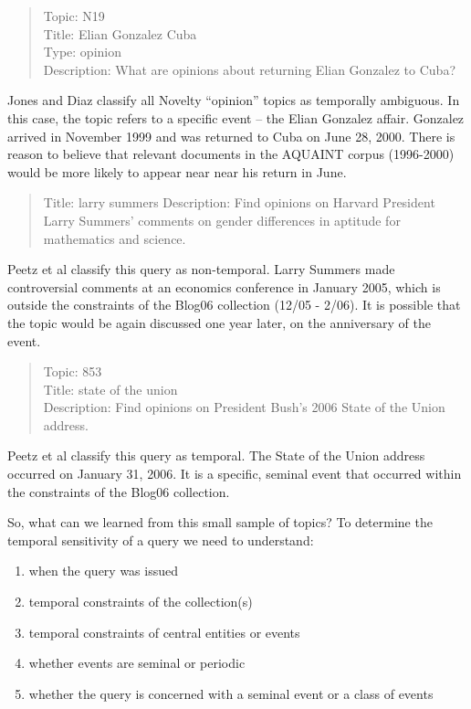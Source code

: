 \documentclass{sig-alternate}
\begin{document}
\begin{quote}
Topic: N19 \\
Title: Elian Gonzalez Cuba  \\
Type: opinion \\
Description: What are opinions about returning Elian Gonzalez to Cuba? \\
\end{quote}

Jones and Diaz classify all Novelty ``opinion'' topics as temporally ambiguous. In this case, the topic refers to a specific event -- the Elian Gonzalez affair. Gonzalez arrived in November 1999 and was returned to Cuba on June 28, 2000. There is reason to believe that relevant documents in the AQUAINT corpus (1996-2000) would be more likely to appear near near his return in June.

\begin{quote}
Title: larry summers	 
Description: Find opinions on Harvard President Larry Summers' comments on gender differences in aptitude for mathematics and science.
\end{quote}

Peetz et al classify this query as non-temporal.  Larry Summers made controversial comments at an economics conference in January 2005, which is outside the constraints of the Blog06 collection (12/05 - 2/06). It is possible that the topic would be again discussed one year later, on the anniversary of the event.

\begin{quote}
Topic: 853 \\
Title: state of the union \\	 
Description: Find opinions on President Bush's 2006 State of the Union address. \\
\end{quote}
Peetz et al classify this query as temporal. The State of the Union address occurred on January 31, 2006. It is a specific, seminal event that occurred within the constraints of the Blog06 collection.

So, what can we learned from this small sample of topics?   To determine the temporal sensitivity of a query we need to understand:

\begin{enumerate}
\item when the query was issued
\item temporal constraints of the collection(s)
\item temporal constraints of central entities or events
\item whether events are seminal or periodic
\item whether the query is concerned with a seminal event or a class of events
\end{enumerate}
\end{document}
